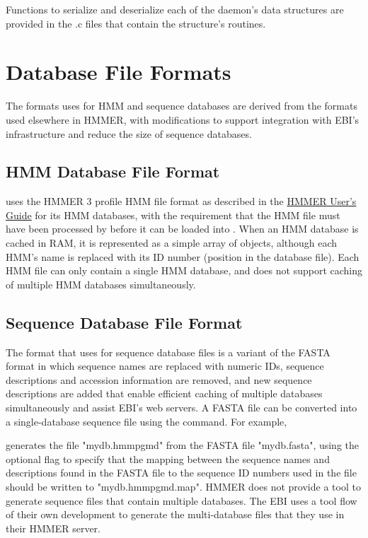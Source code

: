 \documentclass[notoc,justified]{tufte-book}    %
\begin{document}
Functions to serialize and deserialize each of the daemon's data structures are provided in the .c files that contain the structure's routines.     

\chapter{Database File Formats}
The formats  uses for HMM and sequence databases are derived from the formats used elsewhere in HMMER, with modifications to support integration with EBI's infrastructure and reduce the size of sequence databases.

\section{HMM Database File Format}
 uses the HMMER 3 profile HMM file format as described in the \underline{HMMER User's Guide} for its HMM databases, with the requirement that the HMM file must have been processed by  before it can be loaded into .  When an HMM database is cached in RAM, it is represented as a simple array of  objects, although each HMM's name is replaced with its ID number (position in the database file).  Each HMM file can only contain a single HMM database, and  does not support caching of multiple HMM databases simultaneously.

\section{Sequence Database File Format}
The  format that  uses for sequence database files is a variant of the FASTA format in which sequence names are replaced with numeric IDs, sequence descriptions and accession information are removed, and new sequence descriptions are added that enable efficient caching of multiple databases simultaneously and assist EBI's web servers.  
A FASTA file can be converted into a single-database  sequence file using the  command.  For example, 


generates the  file "mydb.hmmpgmd" from the FASTA file "mydb.fasta", using the optional  flag to specify that the mapping between the sequence names and descriptions found in the FASTA file to the sequence ID numbers used in the  file should be written to "mydb.hmmpgmd.map".  HMMER does not provide a tool to generate sequence files that contain multiple databases.  The EBI uses a tool flow of their own development to generate the multi-database files that they use in their HMMER server.
 
\end{document}
